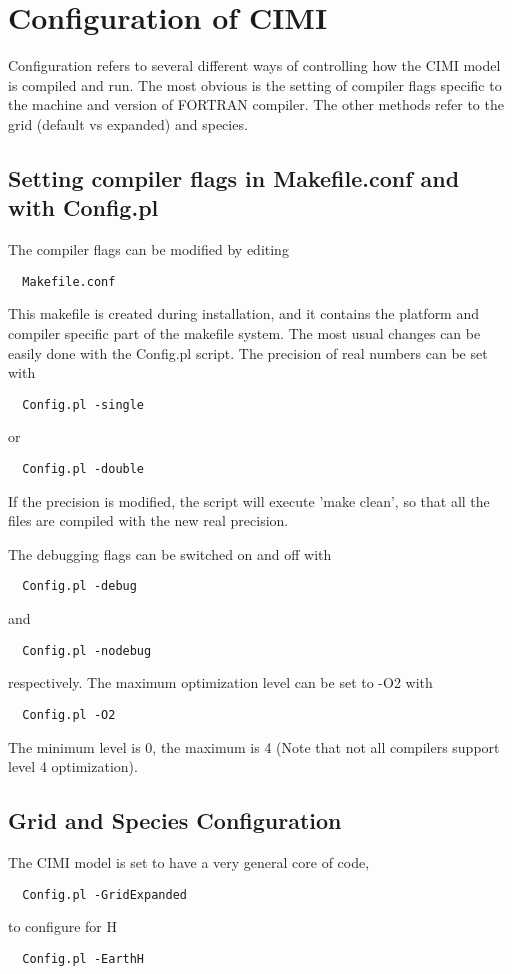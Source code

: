 \section{Configuration of CIMI}

Configuration refers to several different ways of controlling how the 
CIMI model is compiled and run.  The most obvious is the setting of
compiler flags specific to the machine and version of FORTRAN
compiler.  The other methods refer to the grid (default vs expanded) and
species.

\subsection{Setting compiler flags in Makefile.conf and with Config.pl}

The compiler flags can be modified by editing
\begin{verbatim}
  Makefile.conf
\end{verbatim}
This makefile is created during installation, and it contains the
platform and compiler specific part of the makefile system.
The most usual changes can be easily done with the Config.pl script.
The precision of real numbers can be set with
\begin{verbatim}
  Config.pl -single
\end{verbatim}
or 
\begin{verbatim}
  Config.pl -double
\end{verbatim}
If the precision is modified, the script will execute 'make clean',
so that all the files are compiled with the new real precision.

The debugging flags can be switched on and off with
\begin{verbatim}
  Config.pl -debug
\end{verbatim}
and
\begin{verbatim}
  Config.pl -nodebug
\end{verbatim}
respectively. The maximum optimization level can be set to -O2 with
\begin{verbatim}
  Config.pl -O2
\end{verbatim}
The minimum level is 0, the maximum is 4 (Note that not all compilers support
level 4 optimization).

\subsection{Grid and Species Configuration}

The CIMI model is set to have a very general core of code,

\begin{verbatim}
  Config.pl -GridExpanded
\end{verbatim}
to configure for H
\begin{verbatim}
  Config.pl -EarthH
\end{verbatim}


